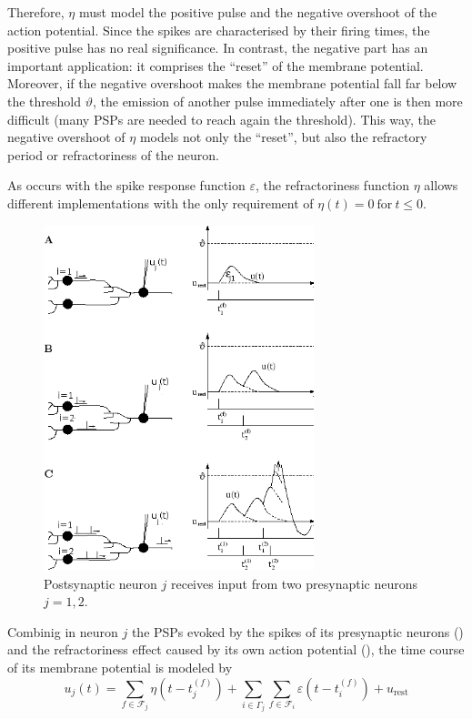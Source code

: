 \begin{description}
{Therefore, $\eta$ must model the positive pulse and the negative overshoot of the action potential. Since the spikes are characterised by their firing times, the positive pulse has no real significance. In contrast, the negative part has an important application: it comprises the ``reset'' of the membrane potential. Moreover, if the negative overshoot makes the membrane potential fall far below the threshold $\vartheta$, the emission of another pulse immediately after one is then more difficult (many PSPs are needed to reach again the threshold). This way, the negative overshoot of $\eta$ models not only the ``reset'', but also the refractory period or refractoriness of the neuron.

As occurs with the spike response function $\varepsilon$, the refractoriness function $\eta$ allows different implementations with the only requirement of $\eta(t)=0~\text{for}~t\leq 0$.
}

\end{description}

\begin{figure}[!ht]
\centering
\includegraphics[width=0.7\textwidth]{images/srm_dynamics_png.png}
\caption{Postsynaptic neuron $j$ receives input from two presynaptic neurons $j=1,2$.}
\label{fig:srmdynamic}
\end{figure} 

Combinig in neuron $j$ the PSPs evoked by the spikes of its presynaptic neurons () and the refractoriness effect caused by its own action potential (), the time course of its membrane potential is modeled by
\begin{equation}
u_{j}(t)=\sum_{f\in \mathcal{F}_{j}}\eta(t-t_{j}^{(f)})+
\sum_{i\in \Gamma_{j}}\sum_{f\in \mathcal{F}_{i}}
	\varepsilon(t-t_{i}^{(f)})+u_{\text{rest}}
\label{eq:srmuniqueconnection}
\end{equation}

